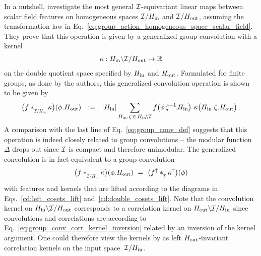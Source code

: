 In a nutshell, \citet{Kondor2018-GENERAL} investigate the most general $\mathcal{I}$-equivariant linear maps between scalar field features on homogeneous spaces $\mathcal{I}/H_{\textup{in}}$ and $\mathcal{I}/H_{\textup{out}}$, assuming the transformation law in Eq.~\eqref{eq:group_action_homogeneous_space_scalar_field}.
They prove that this operation is given by a generalized group convolution with a kernel
\begin{align}
    \kappa: H_{\textup{in}}\backslash \mathcal{I}/H_{\textup{out}} \to \mathbb{R}
\end{align}
on the double quotient space specified by $H_{\textup{in}}$ and $H_{\textup{out}}$.
Formulated for finite groups, as done by the authors, this generalized convolution operation is shown to be given by
\begin{align}\label{eq:quotient_space_conv_Kondor}
    \big(f \ast_{\overset{}{\scalebox{.64}{$\I/\Hin$}}} \kappa \big) (\phi.\Hout)
    \ \ :=\ \ |\Hin| \sum_{\Hin.\zeta \,\in\, \Hin\mkern-2.5mu\backslash\mkern-.5mu\I}
        f\big( \phi\mkern2mu \zeta^{-1}\!. \Hin\big)\ \kappa\big( \Hin.\zeta.\Hout \big) \,.
\end{align}
A comparison with the last line of Eq.~\eqref{eq:group_conv_def} suggests that this operation is indeed closely related to group convolutions -- the modular function $\Delta$ drops out since $\mathcal{I}$ is compact and therefore unimodular.
The generalized convolution is in fact equivalent to a group convolution
\begin{align}
    \big(f \ast_{\overset{}{\scalebox{.64}{$\I/\Hin$}}} \kappa \big) (\phi.\Hout)
    \ =\ \big(f^\uparrow \ast_{\overset{}{\protect\scalebox{.64}{$\mkern-.5mu \I$}}} \kappa^\uparrow \big)(\phi)
\end{align}
with features and kernels that are lifted according to the diagrams in Eqs.~\eqref{cd:left_cosets_lift} and~\eqref{cd:double_cosets_lift}.
Note that the convolution kernel on $H_{\textup{in}}\backslash \mathcal{I}/H_{\textup{out}}$ corresponds to a correlation kernel on $H_{\textup{out}}\backslash \mathcal{I}/H_{\textup{in}}$ since convolutions and correlations are according to Eq.~\eqref{eq:group_conv_corr_kernel_inversion} related by an inversion of the kernel argument.
One could therefore view the kernels by \citet{Kondor2018-GENERAL} as left $H_{\textup{out}}$-invariant correlation kernels on the input space~$\mathcal{I}/H_{\textup{in}}$.


